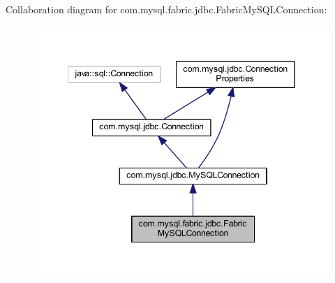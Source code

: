 Collaboration diagram for com.\+mysql.\+fabric.\+jdbc.\+Fabric\+My\+S\+Q\+L\+Connection\+:\nopagebreak
\begin{figure}[H]
\begin{center}
\leavevmode
\includegraphics[width=342pt]{interfacecom_1_1mysql_1_1fabric_1_1jdbc_1_1_fabric_my_s_q_l_connection__coll__graph}
\end{center}
\end{figure}
